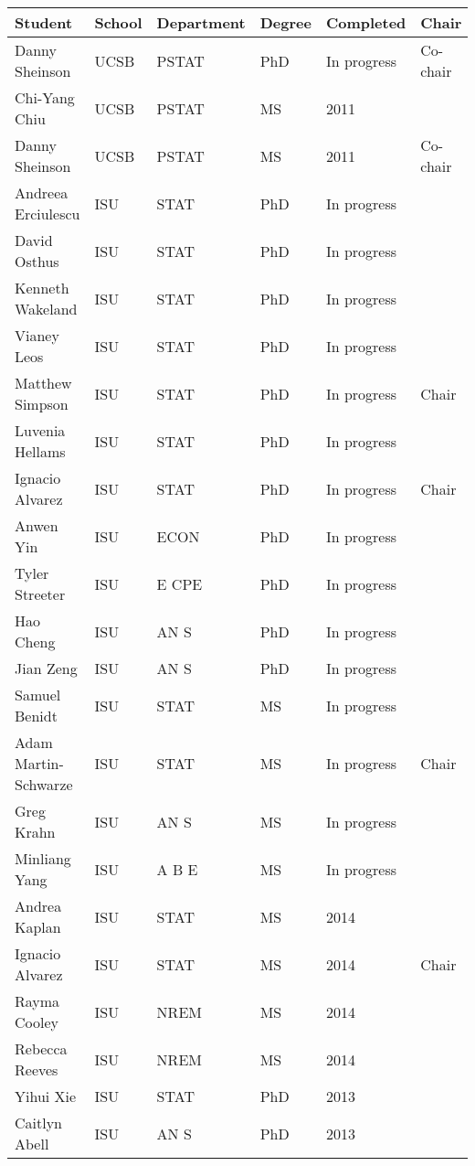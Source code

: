 \begin{table}[h]
\centering
\begin{tabular}{llllll}
  \hline
Student & School & Department & Degree & Completed & Chair \\ 
  \hline
Danny Sheinson & UCSB & PSTAT & PhD & In progress & Co-chair \\ 
  Chi-Yang Chiu & UCSB & PSTAT & MS & 2011 &  \\ 
  Danny Sheinson & UCSB & PSTAT & MS & 2011 & Co-chair \\ 
  Andreea Erciulescu & ISU & STAT & PhD & In progress &  \\ 
  David Osthus & ISU & STAT & PhD & In progress &  \\ 
  Kenneth Wakeland & ISU & STAT & PhD & In progress &  \\ 
  Vianey Leos & ISU & STAT & PhD & In progress &  \\ 
  Matthew Simpson & ISU & STAT & PhD & In progress & Chair \\ 
  Luvenia Hellams & ISU & STAT & PhD & In progress &  \\ 
  Ignacio Alvarez & ISU & STAT & PhD & In progress & Chair \\ 
  Anwen Yin & ISU & ECON & PhD & In progress &  \\ 
  Tyler Streeter & ISU & E CPE & PhD & In progress &  \\ 
  Hao Cheng & ISU & AN S & PhD & In progress &  \\ 
  Jian Zeng & ISU & AN S & PhD & In progress &  \\ 
  Samuel Benidt & ISU & STAT & MS & In progress &  \\ 
  Adam Martin-Schwarze & ISU & STAT & MS & In progress & Chair \\ 
  Greg Krahn & ISU & AN S & MS & In progress &  \\ 
  Minliang Yang & ISU & A B E & MS & In progress &  \\ 
  Andrea Kaplan & ISU & STAT & MS & 2014 &  \\ 
  Ignacio Alvarez & ISU & STAT & MS & 2014 & Chair \\ 
  Rayma Cooley & ISU & NREM & MS & 2014 &  \\ 
  Rebecca Reeves & ISU & NREM & MS & 2014 &  \\ 
  Yihui Xie & ISU & STAT & PhD & 2013 &  \\ 
  Caitlyn Abell & ISU & AN S & PhD & 2013 &  \\ 

\end{tabular}
\end{table}
